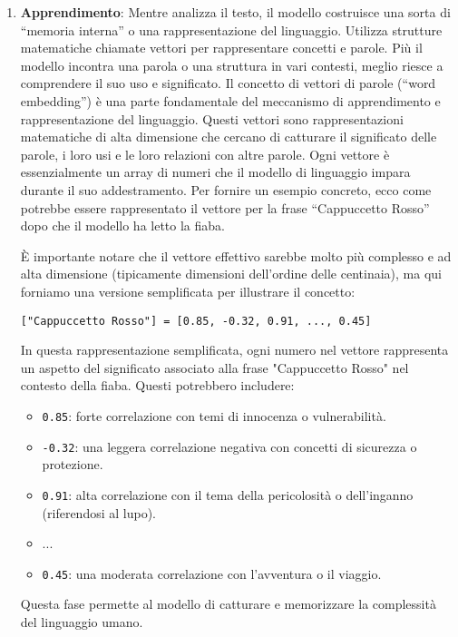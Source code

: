 \begin{enumerate}
                \item
                    \textbf{Apprendimento}: Mentre analizza il testo, il modello costruisce una sorta di ``memoria interna'' o una rappresentazione del linguaggio. Utilizza strutture matematiche chiamate vettori per rappresentare concetti e parole. Più il modello incontra una parola o una struttura in vari contesti, meglio riesce a comprendere il suo uso e significato. Il concetto di vettori di parole (``word embedding'') è una parte fondamentale del meccanismo di apprendimento e rappresentazione del linguaggio. Questi vettori sono rappresentazioni matematiche di alta dimensione che cercano di catturare il significato delle parole, i loro usi e le loro relazioni con altre parole. Ogni vettore è essenzialmente un array di numeri che il modello di linguaggio impara durante il suo addestramento. Per fornire un esempio concreto, ecco come potrebbe essere rappresentato il vettore per la frase ``Cappuccetto Rosso'' dopo che il modello ha letto la fiaba.  

                    È importante notare che il vettore effettivo sarebbe molto più complesso e ad alta dimensione (tipicamente dimensioni dell'ordine delle centinaia), ma qui forniamo una versione semplificata per illustrare il concetto: 

                    \texttt{["Cappuccetto Rosso"] = [0.85, -0.32, 0.91, ..., 0.45]}

                    In questa rappresentazione semplificata, ogni numero nel vettore rappresenta un aspetto del significato associato alla frase "Cappuccetto Rosso" nel contesto della fiaba. Questi potrebbero includere:
                    \begin{itemize}
                        \item \texttt{0.85}: forte correlazione con temi di innocenza o vulnerabilità. 
                        \item \texttt{-0.32}: una leggera correlazione negativa con concetti di sicurezza o protezione. 
                        \item \texttt{0.91}: alta correlazione con il tema della pericolosità o dell'inganno (riferendosi al lupo). 
                        \item ...
                        \item \texttt{0.45}: una moderata correlazione con l'avventura o il viaggio. 
                    \end{itemize}
                    Questa fase permette al modello di catturare e memorizzare la complessità del linguaggio umano.  


\end{enumerate}

